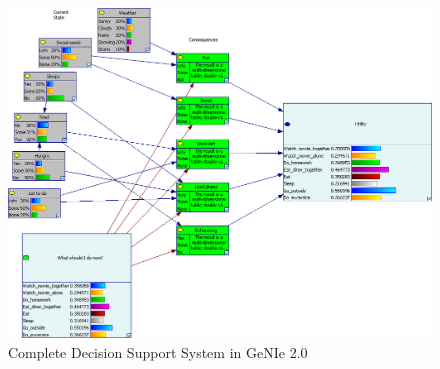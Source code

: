\begin{figure}[h]
\includegraphics[width=154mm]{figure-complete.png}
\caption{Complete Decision Support System in GeNIe 2.0}
\end{figure}
